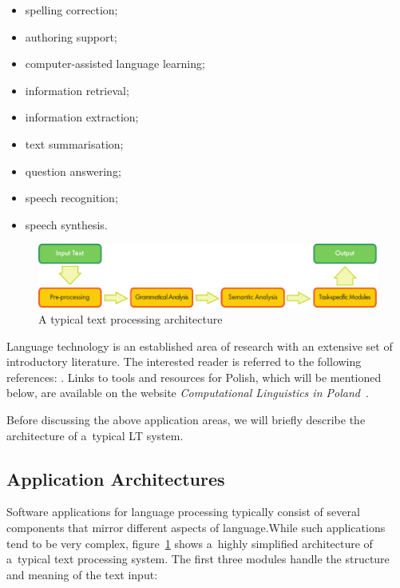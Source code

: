 \begin{multicols}{2}
\begin{itemize} 
  \item spelling correction; 
  \item authoring support;
  \item computer-assisted language learning;
  \item information retrieval;
  \item information extraction;
  \item text summarisation;
  \item question answering;
  \item speech recognition;
  \item speech synthesis.
\end{itemize} 

\begin{figure}[b]  \center
\includegraphics[width=\textwidth]{../_media/english/text_processing_app_architecture}
\caption{A typical text processing architecture} \label{fig:
textprocessingarch_en} 
\end{figure} 

Language technology is an established area of research with an
extensive set of introductory literature. The interested reader is
referred to the following references: \cite{jurafsky-martin01,
manning-schuetze1, lt-world1, lt-survey1, mykowiecka1}. Links to tools
and resources for Polish, which will be mentioned below, are available
on the website \textit{Computational Linguistics in
Poland}~\cite{Clip2}. 

Before discussing the above application areas, we will briefly
describe the architecture of a~typical LT system. 

\subsection{Application Architectures} 

Software applications for language processing typically consist of
several components that mirror different aspects of language.While such applications tend to be very complex, figure~\ref{fig:
textprocessingarch_en} shows a~highly simplified architecture of
a~typical text processing system. The first three modules handle the
structure and meaning of the text input: 


\end{multicols}
